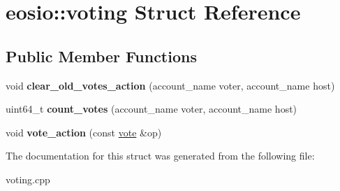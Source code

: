 \hypertarget{structeosio_1_1voting}{}\section{eosio\+:\+:voting Struct Reference}
\label{structeosio_1_1voting}
\subsection*{Public Member Functions}
\begin{DoxyCompactItemize}
\item 
\mbox{\label{structeosio_1_1voting_aeee24d2bf2742584f5a3e764cd856bfb}} 
void {\bfseries clear\+\_\+old\+\_\+votes\+\_\+action} (account\+\_\+name voter, account\+\_\+name host)
\item 
\mbox{\label{structeosio_1_1voting_a3c048fa20881ff15662ddc2380c3b426}} 
uint64\+\_\+t {\bfseries count\+\_\+votes} (account\+\_\+name voter, account\+\_\+name host)
\item 
\mbox{\label{structeosio_1_1voting_a8eb127d952c2f5b5705c467617fef457}} 
void {\bfseries vote\+\_\+action} (const \mbox{\hyperlink{structeosio_1_1vote}{vote}} \&op)
\end{DoxyCompactItemize}


The documentation for this struct was generated from the following file\+:\begin{DoxyCompactItemize}
\item 
voting.\+cpp\end{DoxyCompactItemize}
